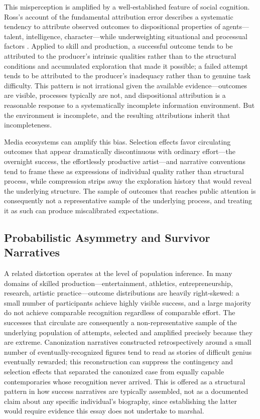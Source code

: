 \documentclass[12pt, a4paper]{article}
\theoremstyle{plain}
\theoremstyle{definition}
\theoremstyle{remark}
\begin{document}
This misperception is amplified by a well-established feature of social cognition. Ross's account of the fundamental attribution error describes a systematic tendency to attribute observed outcomes to dispositional properties of agents---talent, intelligence, character---while underweighting situational and processual factors \cite{ross1977}. Applied to skill and production, a successful outcome tends to be attributed to the producer's intrinsic qualities rather than to the structural conditions and accumulated exploration that made it possible; a failed attempt tends to be attributed to the producer's inadequacy rather than to genuine task difficulty. This pattern is not irrational given the available evidence---outcomes are visible, processes typically are not, and dispositional attribution is a reasonable response to a systematically incomplete information environment. But the environment is incomplete, and the resulting attributions inherit that incompleteness.

Media ecosystems can amplify this bias. Selection effects favor circulating outcomes that appear dramatically discontinuous with ordinary effort---the overnight success, the effortlessly productive artist---and narrative conventions tend to frame these as expressions of individual quality rather than structural process, while compression strips away the exploration history that would reveal the underlying structure. The sample of outcomes that reaches public attention is consequently not a representative sample of the underlying process, and treating it as such can produce miscalibrated expectations.

\subsection{Probabilistic Asymmetry and Survivor Narratives}

A related distortion operates at the level of population inference. In many domains of skilled production---entertainment, athletics, entrepreneurship, research, artistic practice---outcome distributions are heavily right-skewed: a small number of participants achieve highly visible success, and a large majority do not achieve comparable recognition regardless of comparable effort. The successes that circulate are consequently a non-representative sample of the underlying population of attempts, selected and amplified precisely because they are extreme. Canonization narratives constructed retrospectively around a small number of eventually-recognized figures tend to read as stories of difficult genius eventually rewarded; this reconstruction can suppress the contingency and selection effects that separated the canonized case from equally capable contemporaries whose recognition never arrived. This is offered as a structural pattern in how success narratives are typically assembled, not as a documented claim about any specific individual's biography, since establishing the latter would require evidence this essay does not undertake to marshal.
\end{document}
